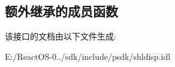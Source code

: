 \subsection*{额外继承的成员函数}


该接口的文档由以下文件生成\+:\begin{DoxyCompactItemize}
\item 
E\+:/\+React\+O\+S-\/0../sdk/include/psdk/shldisp.\+idl\end{DoxyCompactItemize}
